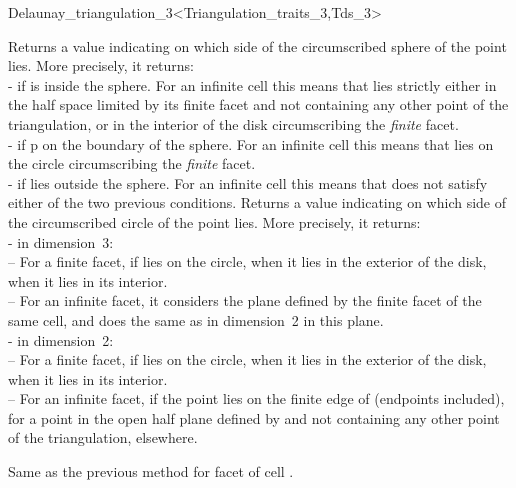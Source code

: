 \begin{ccRefClass}{Delaunay_triangulation_3<Triangulation_traits_3,Tds_3>}

{Returns a value indicating on which side of the circumscribed sphere
of  the point  lies. More precisely, it returns:\\
-  if  is inside the sphere. For an infinite
cell this means that  lies strictly either in the half space
limited by its finite facet and not containing any other point of the
triangulation, or in the interior of the disk circumscribing the
\textit{finite} facet. \\ 
-  if p on the boundary of the sphere. For an infinite
cell this means that  lies on the circle circumscribing
the \textit{finite} facet.\\ 
-  if  lies outside the sphere. For an
infinite cell this means that  does not satisfy either of the
two previous conditions. 
}
{Returns a value indicating on which side of the circumscribed circle
of  the point  lies. More precisely, it returns:\\
- in dimension~3:\\
-- For a finite facet,  if  lies
on the circle,  when it lies in the exterior of
the disk,  when it lies in its interior.\\
-- For an infinite facet, it considers the plane defined by the finite
facet of the same cell, and does the same as in dimension~2 in this
plane.\\
- in dimension~2:\\
-- For a finite facet,  if  lies
on the circle,  when it lies in the exterior of
the disk,  when it lies in its interior.\\
-- For an infinite facet,  if the
point lies on the finite edge of  (endpoints included),
 for a point in the open half plane defined
by  and not containing any other point of the triangulation,
 elsewhere. 
}

{Same as the previous method for facet  of cell .}


\end{ccRefClass}

